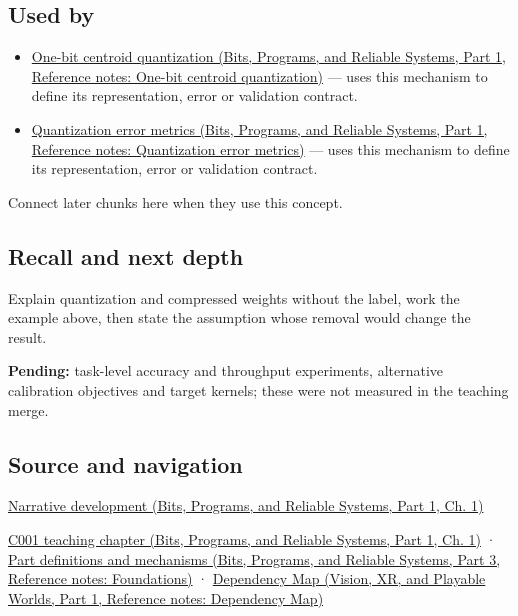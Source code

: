 \subsection{Used by}\label{appendix-fdc7879e8bf2-used-by}

\hypertarget{appendix-fdc7879e8bf2-used-by}{}

\begin{itemize}
\tightlist
\item
  \href{../01-Bits-Programs-and-Reliable-Systems-P01/main.pdf\#appendix-4ccd7a775813}{One-bit centroid quantization (Bits, Programs, and Reliable Systems, Part 1, Reference notes: One-bit centroid quantization)} --- uses this mechanism to define its representation, error or validation contract.
\item
  \href{../01-Bits-Programs-and-Reliable-Systems-P01/main.pdf\#appendix-537171d69d27}{Quantization error metrics (Bits, Programs, and Reliable Systems, Part 1, Reference notes: Quantization error metrics)} --- uses this mechanism to define its representation, error or validation contract.
\end{itemize}

Connect later chunks here when they use this concept.

\subsection{Recall and next depth}\label{appendix-fdc7879e8bf2-recall-and-next-depth}

\hypertarget{appendix-fdc7879e8bf2-recall-and-next-depth}{}

Explain quantization and compressed weights without the label, work the example above, then state the assumption whose removal would change the result.

\textbf{Pending:} task-level accuracy and throughput experiments, alternative calibration objectives and target kernels; these were not measured in the teaching merge.

\subsection{Source and navigation}\label{appendix-fdc7879e8bf2-source-and-navigation}

\hypertarget{appendix-fdc7879e8bf2-source-and-navigation}{}

\href{../01-Bits-Programs-and-Reliable-Systems-P01/main.pdf\#01-foundations-i-ch001-choosing-what-information-to-keep}{Narrative development (Bits, Programs, and Reliable Systems, Part 1, Ch. 1)}

\href{../01-Bits-Programs-and-Reliable-Systems-P01/main.pdf\#01-foundations-i-ch001-from-a-signal-to-an-interpretation}{C001 teaching chapter (Bits, Programs, and Reliable Systems, Part 1, Ch. 1)} · \href{../01-Bits-Programs-and-Reliable-Systems-P03/main.pdf\#appendix-fd090d982a15}{Part definitions and mechanisms (Bits, Programs, and Reliable Systems, Part 3, Reference notes: Foundations)} · \href{../07-Vision-XR-and-Playable-Worlds-P01/main.pdf\#appendix-4ad47bdd269a}{Dependency Map (Vision, XR, and Playable Worlds, Part 1, Reference notes: Dependency Map)}
